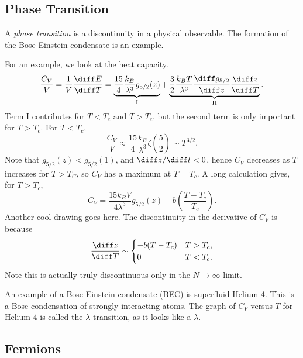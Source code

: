 \documentclass[12pt]{article}
\begin{document}
\subsection{Phase Transition}
\label{sub:pha_tr}

A \emph{phase transition} is a discontinuity in a physical observable. The formation of the Bose-Einstein condensate is an example.

For an example, we look at the heat capacity.
\[
	\frac{C_V}{V} = \frac{1}{V} \frac{\diff E}{\diff T} = \underbrace{\frac{15}{4} \frac{k_B}{\lambda^3} g_{5/2}(z)}_{\text{I}} + \underbrace{\frac{3}{2} \frac{k_B T}{\lambda^3} \frac{\diff g_{5/2}}{\diff z} \frac{\diff z}{\diff T}}_{\text{II}}.
\]
Term I contributes for $T < T_c$ and $T > T_c$, but the second term is only important for $T > T_c$. For $T < T_c$,
\[
\frac{C_V}{V} \approx \frac{15}{4} \frac{k_B}{\lambda^3} \zeta \left( \frac{5}{2}\right) \sim T^{3/2}.
\]
Note that $g_{5/2}(z) < g_{5/2}(1)$, and $\diff z/\diff t < 0$, hence $C_V$ decreases as $T$ increases for $T > T_C$, so $C_V$ has a maximum at $T = T_c$. A long calculation gives, for $T > T_c$,
\[
C_V = \frac{15 k_B V}{4 \lambda^3} g_{5/2}(z) - b \left( \frac{T - T_c}{T_c} \right).
\]
Another cool drawing goes here. The discontinuity in the derivative of $C_V$ is because
\[
\frac{\diff z}{\diff T} \sim
\begin{cases}
	- b(T - T_c) & T > T_c,\\
	0 & T < T_c.
\end{cases}
\]
Note this is actually truly discontinuous only in the $N \to \infty$ limit.

An example of a Bose-Einstein condensate (BEC) is superfluid Helium-4. This is a Bose condensation of strongly interacting atoms. The graph of $C_V$ versus $T$ for Helium-4 is called the $\lambda$-transition, as it looks like a $\lambda$.

\subsection{Fermions}
\label{sub:ferm}
\end{document}
